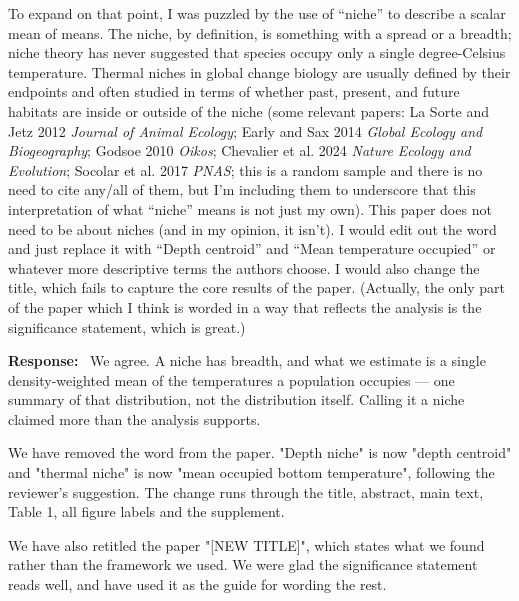 \documentclass[11pt]{article}
\newcommand{\reviewer}[1]{\par\medskip\noindent\textcolor{revcolor}{#1}\par}
\newenvironment{reply}
{\par\smallskip\begingroup\color{replycolor}\noindent\textbf{Response:}\ }
{\endgroup\par\medskip}
\begin{document}
\reviewer{To expand on that point, I was puzzled by the use of ``niche'' to
describe a scalar mean of means. The niche, by definition, is something with a
spread or a breadth; niche theory has never suggested that species occupy only a
single degree-Celsius temperature. Thermal niches in global change biology are
usually defined by their endpoints and often studied in terms of whether past,
present, and future habitats are inside or outside of the niche (some relevant
papers: La Sorte and Jetz 2012 \textit{Journal of Animal Ecology}; Early and Sax
2014 \textit{Global Ecology and Biogeography}; Godsoe 2010 \textit{Oikos};
Chevalier et al. 2024 \textit{Nature Ecology and Evolution}; Socolar et al. 2017
\textit{PNAS}; this is a random sample and there is no need to cite any/all of them,
but I'm including them to underscore that this interpretation of what ``niche''
means is not just my own). This paper does not need to be about niches (and in my
opinion, it isn't). I would edit out the word and just replace it with ``Depth
centroid'' and ``Mean temperature occupied'' or whatever more descriptive terms the
authors choose. I would also change the title, which fails to capture the core
results of the paper. (Actually, the only part of the paper which I think is worded
in a way that reflects the analysis is the significance statement, which is great.)}

\begin{reply}
We agree. A niche has breadth, and what we estimate is a single density-weighted mean of the temperatures a population occupies — one summary of that distribution, not the distribution itself. Calling it a niche claimed more than the analysis supports.

We have removed the word from the paper. "Depth niche" is now "depth centroid" and "thermal niche" is now "mean occupied bottom temperature", following the reviewer's suggestion. The change runs through the title, abstract, main text, Table 1, all figure labels and the supplement.

We have also retitled the paper "[NEW TITLE]", which states what we found rather than the framework we used. We were glad the significance statement reads well, and have used it as the guide for wording the rest.
\end{reply}
\end{document}
